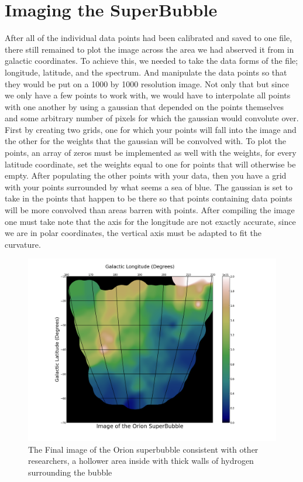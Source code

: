 \documentclass[12 pt]{article}
\begin{document}
\section*{Imaging the SuperBubble}
After all of the individual data points had been calibrated and 
saved to one file,  there still remained to plot the image across the
area we had abserved it from in galactic coordinates. To achieve this,
we needed to take the data forms of the file; longitude, latitude, and
the spectrum. And manipulate the data points so that they would be put
on a 1000 by 1000 resolution image. Not only that but since we only have
a few points to work with, we would have to interpolate all points with
one another by using a gaussian that depended on the points themselves
and some arbitrary number of pixels for which the gaussian would
convolute over. First by creating two grids, one for which your points
will fall into the image and the other for the weights that the gaussian
will be convolved with. To plot the points,  an array of zeros must be
implemented as well with the weights, for every latitude coordinate,
set the weights equal to one for points that will otherwise be
empty. After populating the other points with your data,  then you have
a grid with your points surrounded by what seems a sea of blue. The
gaussian is set to take in the points that happen to be there so that
points containing data points will be more convolved than areas barren
with points. After compiling the image one must take note that the axis
for the longitude are not exactly accurate,  since we are in polar
coordinates,  the vertical axis must be adapted to fit the curvature. 

\begin{figure}[H]
\centering
\includegraphics[scale=.45]{bubbleimage.png}
\caption{The Final image of the Orion superbubble consistent with other
  researchers, a hollower area inside with thick walls of hydrogen
  surrounding the bubble}
\label{bubble}
\end{figure}
\end{document}
